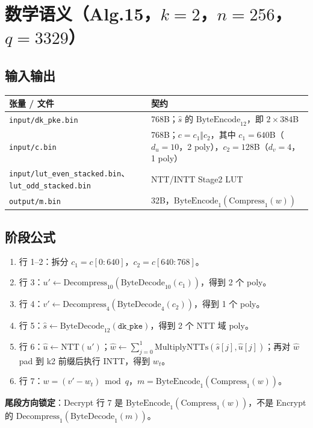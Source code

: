 \documentclass[UTF8,a4paper,11pt]{ctexart}
\begin{document}
\section{数学语义（Alg.15，$k=2$，$n=256$，$q=3329$）}

\subsection{输入输出}

\begin{longtable}{@{}L{3.3cm}L{10.2cm}@{}}
\toprule
张量 / 文件 & 契约 \\
\midrule
\texttt{input/dk\_pke.bin} & 768B；\(\hat s\) 的 \(\mathrm{ByteEncode}_{12}\)，即 \(2\times384\)B \\
\texttt{input/c.bin} & 768B；\(c=c_1\Vert c_2\)，其中 \(c_1=640\)B（\(d_u=10\)，2 poly），\(c_2=128\)B（\(d_v=4\)，1 poly） \\
\texttt{input/lut\_even\_stacked.bin}、\texttt{lut\_odd\_stacked.bin} & NTT/INTT Stage2 LUT \\
\texttt{output/m.bin} & 32B，\(\mathrm{ByteEncode}_{1}(\mathrm{Compress}_{1}(w))\) \\
\bottomrule
\end{longtable}

\subsection{阶段公式}

\begin{enumerate}
  \item 行 1--2：拆分 \(c_1=c[0:640]\)，\(c_2=c[640:768]\)。
  \item 行 3：\(u'\leftarrow\mathrm{Decompress}_{10}(\mathrm{ByteDecode}_{10}(c_1))\)，得到 2 个 poly。
  \item 行 4：\(v'\leftarrow\mathrm{Decompress}_{4}(\mathrm{ByteDecode}_{4}(c_2))\)，得到 1 个 poly。
  \item 行 5：\(\hat s\leftarrow\mathrm{ByteDecode}_{12}(\texttt{dk\_pke})\)，得到 2 个 NTT 域 poly。
  \item 行 6：\(\hat u\leftarrow\mathrm{NTT}(u')\)；\(\hat w\leftarrow\sum_{j=0}^{1}\mathrm{MultiplyNTTs}(\hat s[j],\hat u[j])\)；再对 \(\hat w\) pad 到 k2 前缀后执行 INTT，得到 \(w_t\)。
  \item 行 7：\(w=(v'-w_t)\bmod q\)，\(m=\mathrm{ByteEncode}_{1}(\mathrm{Compress}_{1}(w))\)。
\end{enumerate}

\textbf{尾段方向锁定}：Decrypt 行 7 是 \(\mathrm{ByteEncode}_{1}(\mathrm{Compress}_{1}(w))\)，不是 Encrypt 的 \(\mathrm{Decompress}_{1}(\mathrm{ByteDecode}_{1}(m))\)。
\end{document}
